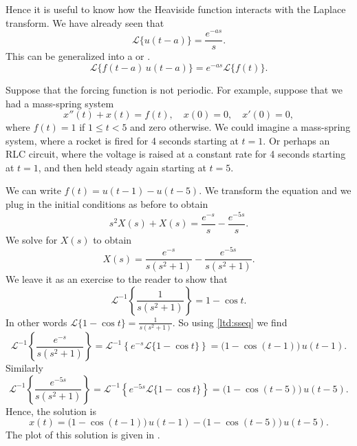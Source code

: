 \documentclass[12pt]{book}
\begin{document}
Hence it is 
useful to know how the Heaviside function interacts with the Laplace
transform.  We have already seen that
\begin{equation*}
\mathcal{L} \{ u(t-a) \} = \frac{e^{-as}}{s} .
\end{equation*}
This can be generalized into a \emph{}
or \emph{}.
\begin{equation} \label{ltd:sseq}
\boxed{~~
\mathcal{L} \{ f(t-a) \, u(t-a) \} = e^{-as} \mathcal{L} \{ f(t) \} .
~~}
\end{equation}

\begin{example} \label{lt:rocketex}
Suppose that the forcing function is not periodic.  For example,
suppose that we had a mass-spring system
\begin{equation*}
x''(t) + x(t) = f(t) , \quad x(0) = 0, \quad x'(0) = 0,
\end{equation*}
where $f(t) = 1$ if $1 \leq t < 5$ and zero otherwise.  We could imagine a
mass-spring system, where a rocket is fired for 4 seconds starting at
$t=1$.  Or perhaps an RLC circuit, where the voltage is raised
at a constant rate for 4 seconds starting at $t=1$, and then held steady 
again
starting at $t=5$.

We can
write $f(t) = u(t-1) - u(t-5)$.  We transform the equation and we plug in
the initial conditions as before to obtain
\begin{equation*}
s^2 X(s) + X(s) = \frac{e^{-s}}{s} - \frac{e^{-5s}}{s} .
\end{equation*}
We solve for $X(s)$ to obtain
\begin{equation*}
X(s) = \frac{e^{-s}}{s(s^2+1)} - \frac{e^{-5s}}{s(s^2+1)} .
\end{equation*}
We leave it as an exercise to the reader to show that
\begin{equation*}
{\mathcal{L}}^{-1} \left\{ \frac{1}{s(s^2+1)} \right\}
= 1 - \cos t .
\end{equation*}
In other words 
$\mathcal{L} \{ 1 - \cos t  \} = 
\frac{1}{s(s^2+1)}$.  So using \eqref{ltd:sseq} we find
\begin{equation*}
{\mathcal{L}}^{-1} \left\{ \frac{e^{-s}}{s(s^2+1)} \right\}
=
{\mathcal{L}}^{-1} \left\{
e^{-s}
\mathcal{L} \{ 1 - \cos t \}
\right\}
=
\bigl( 1 - \cos (t-1) \bigr) \, u(t-1) .
\end{equation*}
Similarly
\begin{equation*}
{\mathcal{L}}^{-1} \left\{ \frac{e^{-5s}}{s(s^2+1)} \right\}
=
{\mathcal{L}}^{-1} \left\{
e^{-5s}
\mathcal{L} \{ 1 - \cos t \}
\right\}
=
\bigl( 1 - \cos (t-5) \bigr) \, u(t-5) .
\end{equation*}
Hence, the solution is
\begin{equation*}
x(t) = 
\bigl( 1 - \cos (t-1) \bigr) \, u(t-1) -
\bigl( 1 - \cos (t-5) \bigr) \, u(t-5) .
\end{equation*}
The plot of this solution is given in .


\end{example}
\end{document}
